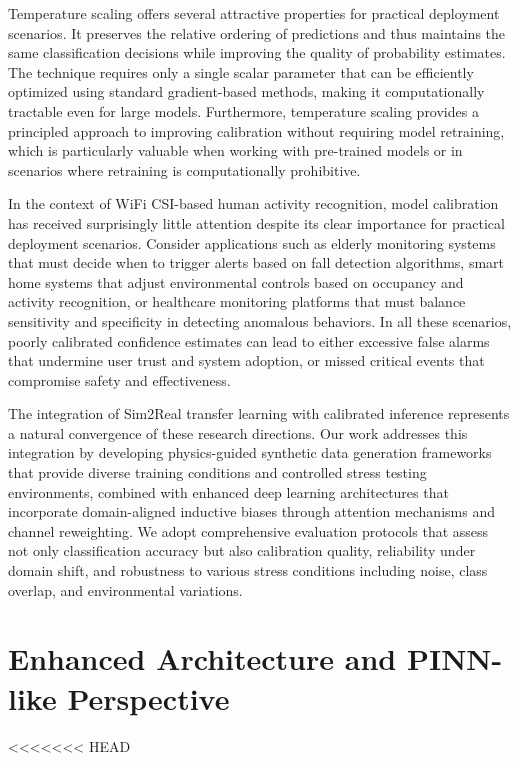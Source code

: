 \documentclass[journal]{IEEEtran}
\begin{document}
Temperature scaling offers several attractive properties for practical deployment scenarios. It preserves the relative ordering of predictions and thus maintains the same classification decisions while improving the quality of probability estimates. The technique requires only a single scalar parameter that can be efficiently optimized using standard gradient-based methods, making it computationally tractable even for large models. Furthermore, temperature scaling provides a principled approach to improving calibration without requiring model retraining, which is particularly valuable when working with pre-trained models or in scenarios where retraining is computationally prohibitive.

In the context of WiFi CSI-based human activity recognition, model calibration has received surprisingly little attention despite its clear importance for practical deployment scenarios. Consider applications such as elderly monitoring systems that must decide when to trigger alerts based on fall detection algorithms, smart home systems that adjust environmental controls based on occupancy and activity recognition, or healthcare monitoring platforms that must balance sensitivity and specificity in detecting anomalous behaviors. In all these scenarios, poorly calibrated confidence estimates can lead to either excessive false alarms that undermine user trust and system adoption, or missed critical events that compromise safety and effectiveness.

The integration of Sim2Real transfer learning with calibrated inference represents a natural convergence of these research directions. Our work addresses this integration by developing physics-guided synthetic data generation frameworks that provide diverse training conditions and controlled stress testing environments, combined with enhanced deep learning architectures that incorporate domain-aligned inductive biases through attention mechanisms and channel reweighting. We adopt comprehensive evaluation protocols that assess not only classification accuracy but also calibration quality, reliability under domain shift, and robustness to various stress conditions including noise, class overlap, and environmental variations.

\section{Enhanced Architecture and PINN-like Perspective}
<<<<<<< HEAD
\end{document}
